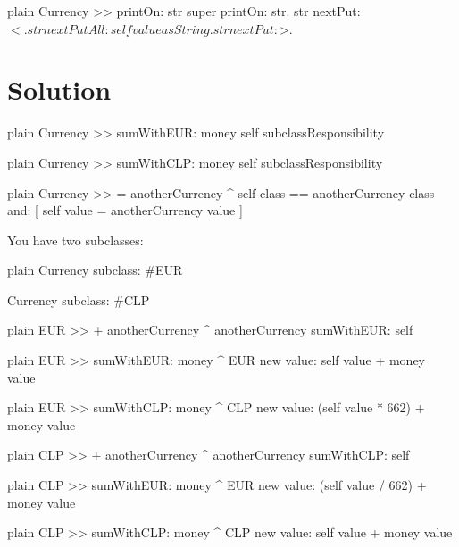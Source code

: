 \documentclass[10pt,twoside,english]{_support/latex/sbabook/sbabook}
\begin{document}
\begin{displaycode}{plain}
Currency >> printOn: str
   super printOn: str.
   str nextPut: $<.
   str nextPutAll: self value asString.
   str nextPut: $>.
\end{displaycode}
\section{Solution}
\begin{displaycode}{plain}
Currency >> sumWithEUR: money 
   self subclassResponsibility 
\end{displaycode}

\begin{displaycode}{plain}
Currency >> sumWithCLP: money 
   self subclassResponsibility 
\end{displaycode}

\begin{displaycode}{plain}
Currency >> = anotherCurrency 
  ^ self class == anotherCurrency class and: [ self value = anotherCurrency value ]
\end{displaycode}

You have two subclasses: 

\begin{displaycode}{plain}
Currency subclass: #EUR 

Currency subclass: #CLP 
\end{displaycode}

\begin{displaycode}{plain}
EUR >> + anotherCurrency 
   ^ anotherCurrency sumWithEUR: self
\end{displaycode}

\begin{displaycode}{plain}
EUR >> sumWithEUR: money 
   ^ EUR new value: self value + money value
\end{displaycode}

\begin{displaycode}{plain}
EUR >> sumWithCLP: money 
   ^ CLP new value: (self value * 662) + money value
\end{displaycode}

\begin{displaycode}{plain}
CLP >> + anotherCurrency
   ^ anotherCurrency sumWithCLP: self
\end{displaycode}

\begin{displaycode}{plain}
CLP >> sumWithEUR: money
   ^ EUR new value: (self value / 662) + money value
\end{displaycode}

\begin{displaycode}{plain}
CLP >> sumWithCLP: money
  ^ CLP new value: self value + money value
\end{displaycode}


\backmatter



\end{document}
